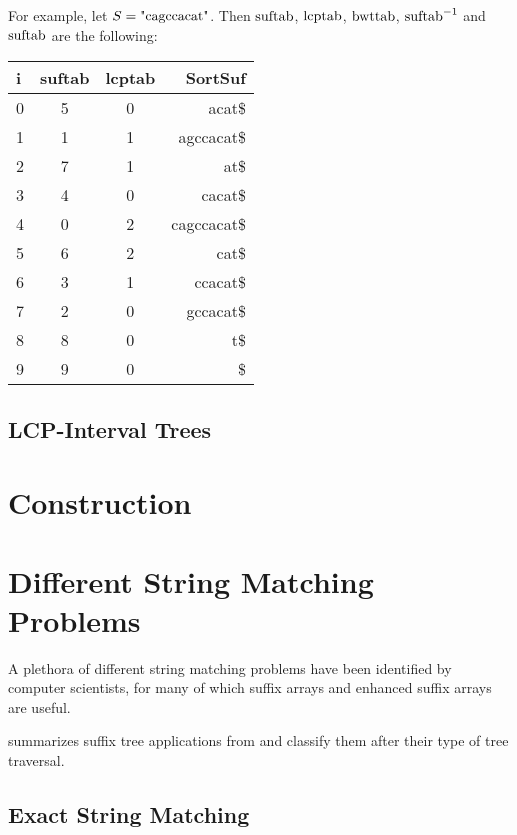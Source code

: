 \documentclass[a4paper,10pt]{article}
\begin{document}
For example, let $S=\hbox{"cagccacat"}$.  Then $\hbox{suftab}$,
$\hbox{lcptab}$, $\hbox{bwttab}$, $\hbox{suftab}^{-1}$ and
$\hbox{suftab}$ are the following:

\begin{center}
	\begin{tabular}{ | l | c | c | r | }
		\hline
		i & suftab & lcptab & SortSuf \\ \hline
		0 & 5 & 0 & acat\$ \\ \hline
		1 & 1 & 1 & agccacat\$ \\ \hline
		2 & 7 & 1 & at\$ \\ \hline
		3 & 4 & 0 & cacat\$ \\ \hline
		4 & 0 & 2 & cagccacat\$ \\ \hline
		5 & 6 & 2 & cat\$ \\ \hline
		6 & 3 & 1 & ccacat\$ \\ \hline
		7 & 2 & 0 & gccacat\$ \\ \hline
		8 & 8 & 0 & t\$ \\ \hline
		9 & 9 & 0 & \$ \\ \hline
	\end{tabular}
\end{center}

\subsection*{LCP-Interval Trees}


\section*{Construction}

\section*{Different String Matching Problems}

A plethora of different string matching problems have been identified
by computer scientists, for many of which suffix arrays and enhanced
suffix arrays are useful.

\citealt[pg. 2]{abouelhoda2004replacing} summarizes suffix tree applications
from \citealt[chap. 2]{gusfield1997algorithms} and classify them after their
type of tree traversal.

\subsection*{Exact String Matching}
\end{document}
